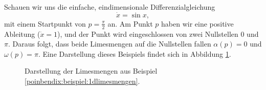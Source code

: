 \begin{beispiel} \label{poinbendix:beispiel:1dlimesmengen}
Schauen wir uns die einfache, eindimensionale Differenzialgleichung
\begin{equation*}
    \dot{x} = \sin x,
\end{equation*}
mit einem Startpunkt von $p = \frac{\pi}{2}$ an.
Am Punkt $p$ haben wir eine positive Ableitung ($\dot{x} = 1$), und der Punkt wird eingeschlossen von zwei Nullstellen $0$ und $\pi$.
Daraus folgt, dass beide Limesmengen auf die Nullstellen fallen $\alpha(p) = 0$ und $\omega(p) = \pi$.
Eine Darstellung dieses Beispiels findet sich in Abbildung \ref{poinbendix:fig:limesmenge}.
\begin{figure}
    \centering
    
    \caption{Darstellung der Limesmengen aus Beispiel \ref{poinbendix:beispiel:1dlimesmengen}.}
    \label{poinbendix:fig:limesmenge}
\end{figure}
\end{beispiel}
